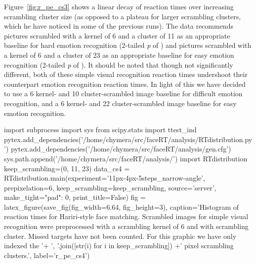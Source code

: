 	    Figure~\ref{fig:r_pe_cs3} shows a linear decay of reaction times over increasing scrambling cluster size
	    (as opposed to a plateau for larger scrambling clusters, which he have noticed in some of the previous runs).
	    The data recommends pictures scrambled with a kernel of \SI{6}{\pixel} and a cluster of \SI{11}{\pixel} as an appropriate baseline for hard emotion recognition
	    (2-tailed \textit{p} of )
	    and pictures scrambled with a kernel of \SI{6}{\pixel} and a cluster of \SI{23}{\pixel} as an appropriate baseline for easy emotion recognition
	    (2-tailed \textit{p} of ).
	    It should be noted that though not significantly different, both of these simple visual recognition reaction times undershoot their counterpart emotion recognition reaction times.
	    In light of this we have decided to use a \SI{6}{\pixel} kernel- and \SI{10}{\pixel} cluster-scrambled image baseline for difficult emotion recognition, 
	    and a \SI{6}{\pixel} kernel- and \SI{22}{\pixel} cluster-scrambled image baseline for easy emotion recognition.
	    \begin{pycode}
		import subprocess
		import sys
		from scipy.stats import ttest_ind
		pytex.add_dependencies('/home/chymera/src/faceRT/analysis/RTdistribution.py')
		pytex.add_dependencies('/home/chymera/src/faceRT/analysis/gen.cfg')
		sys.path.append('/home/chymera/src/faceRT/analysis/')
		import RTdistribution
		keep_scrambling=(0, 11, 23)
		data_cs4 = RTdistribution.main(experiment='11px-4px-5steps_narrow-angle', prepixelation=6, keep_scrambling=keep_scrambling, source='server', make_tight={"pad": 0}, print_title=False)
		fig = latex_figure(save_fig(fig_width=6.64, fig_height=3), caption='Histogram of reaction times for Hariri-style face matching. Scrambled images for simple visual recognition were preprocessed with a scrambling kernel of \SI{6}{\pixel} and with scrambling cluster. Missed targets have not been counted. For this graphic we have only indexed the '+ ', '.join([str(i) for i in keep_scrambling]) +' pixel scrambling clusters.', label='r_pe_cs4')
	    \end{pycode}
	    
